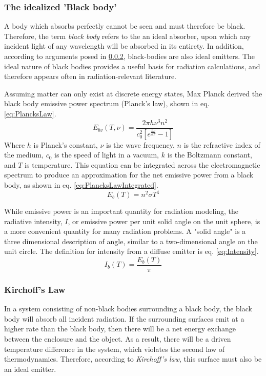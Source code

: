 \subsubsection{The idealized 'Black body'}
A body which absorbs perfectly cannot be seen and must therefore be black. Therefore, the term \textit{black body} refers to the an ideal absorber, upon which any incident light of any wavelength will be absorbed in its entirety. In addition, according to arguments posed in \ref{sec:KirchoffsLaw}, black-bodies are also ideal emitters.
The ideal nature of black bodies provides a useful basis for radiation calculations, and therefore appears often in radiation-relevant literature.

Assuming matter can only exist at discrete energy states, Max Planck derived the black body emissive power spectrum (Planck's law), shown in eq. \ref{eq:PlancksLaw}.
\begin{equation}
    E_{bv}(T,\nu{}) = \frac{2\pi{}h\nu{}^3n^2}{c_0^2\left[e^\frac{h\nu{}}{kT}-1\right]}
    \label{eq:PlancksLaw}
\end{equation}
Where $h$ is Planck's constant, $\nu{}$ is the wave frequency, $n$ is the refractive index of the medium, $c_0$ is the speed of light in a vacuum, $k$ is the Boltzmann constant, and $T$ is temperature. This equation can be integrated across the electromagnetic spectrum to produce an approximation for the net emissive power from a black body, as shown in eq. \ref{eq:PlancksLawIntegrated}.
\begin{equation}
    E_b(T) = n^2\sigma{}T^4
    \label{eq:PlancksLawIntegrated}
\end{equation}

While emissive power is an important quantity for radiation modeling, the radiative intensity, $I$, or emissive power per unit solid angle on the unit sphere, is a more convenient quantity for many radiation problems. A "solid angle" is a three dimensional description of angle, similar to a two-dimensional angle on the unit circle. The definition for intensity from a diffuse emitter is eq. \ref{eq:Intensity}.
\begin{equation}
    I_b(T) = \frac{E_b(T)}{\pi}
    \label{eq:Intensity}
\end{equation}


\subsubsection{Kirchoff's Law} \label{sec:KirchoffsLaw}
In a system consisting of non-black bodies surrounding a black body, the black body will absorb all incident radiation.
If the surrounding surfaces emit at a higher rate than the black body, then there will be a net energy exchange between the enclosure and the object.
As a result, there will be a driven temperature difference in the system, which violates the second law of thermodynamics.
Therefore, according to \textit{Kirchoff's law}, this surface must also be an ideal emitter.


